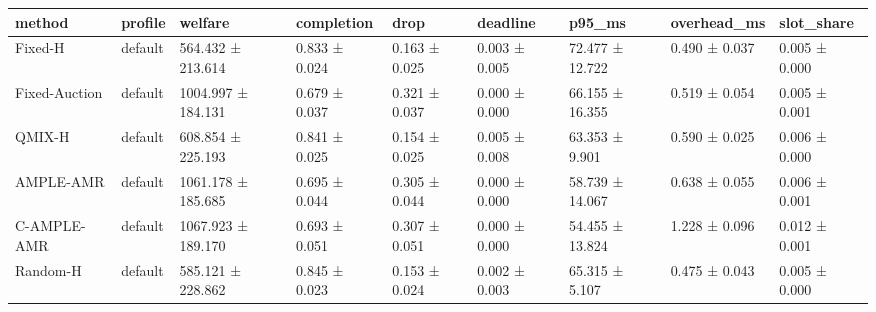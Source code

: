 \begin{tabular}{lllllllll}
\toprule
method & profile & welfare & completion & drop & deadline & p95\_ms & overhead\_ms & slot\_share \\
\midrule
Fixed-H & default & 564.432 ± 213.614 & 0.833 ± 0.024 & 0.163 ± 0.025 & 0.003 ± 0.005 & 72.477 ± 12.722 & 0.490 ± 0.037 & 0.005 ± 0.000 \\
Fixed-Auction & default & 1004.997 ± 184.131 & 0.679 ± 0.037 & 0.321 ± 0.037 & 0.000 ± 0.000 & 66.155 ± 16.355 & 0.519 ± 0.054 & 0.005 ± 0.001 \\
QMIX-H & default & 608.854 ± 225.193 & 0.841 ± 0.025 & 0.154 ± 0.025 & 0.005 ± 0.008 & 63.353 ± 9.901 & 0.590 ± 0.025 & 0.006 ± 0.000 \\
AMPLE-AMR & default & 1061.178 ± 185.685 & 0.695 ± 0.044 & 0.305 ± 0.044 & 0.000 ± 0.000 & 58.739 ± 14.067 & 0.638 ± 0.055 & 0.006 ± 0.001 \\
C-AMPLE-AMR & default & 1067.923 ± 189.170 & 0.693 ± 0.051 & 0.307 ± 0.051 & 0.000 ± 0.000 & 54.455 ± 13.824 & 1.228 ± 0.096 & 0.012 ± 0.001 \\
Random-H & default & 585.121 ± 228.862 & 0.845 ± 0.023 & 0.153 ± 0.024 & 0.002 ± 0.003 & 65.315 ± 5.107 & 0.475 ± 0.043 & 0.005 ± 0.000 \\
\bottomrule
\end{tabular}
